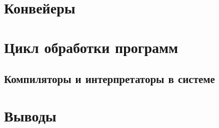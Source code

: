 \subsection{}

\subsection{}

\subsection{}

\subsection{}

\subsection{}

\subsection{}

\section{Конвейеры}

\subsection{\code{|}}

\subsection{\code{||}}

\subsection{\code{\&\&}}

\section{Цикл обработки программ}

\subsection{Компиляторы и интерпретаторы в системе}

\subsection{}


\section{Выводы}


